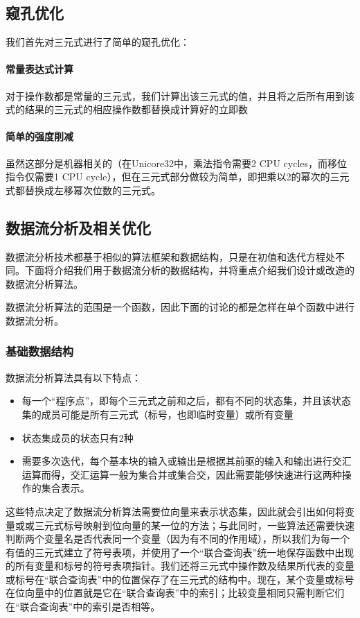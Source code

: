 \subsection{窥孔优化}
我们首先对三元式进行了简单的窥孔优化：
\paragraph*{常量表达式计算} 对于操作数都是常量的三元式，我们计算出该三元式的值，并且将之后所有用到该式的结果的三元式的相应操作数都替换成计算好的立即数
\paragraph*{简单的强度削减} 虽然这部分是机器相关的（在Unicore32中，乘法指令需要2 CPU cycles，而移位指令仅需要1 CPU cycle），但在三元式部分做较为简单，即把乘以2的幂次的三元式都替换成左移幂次位数的三元式。

\subsection{数据流分析及相关优化}
数据流分析技术都基于相似的算法框架和数据结构，只是在初值和迭代方程处不同。下面将介绍我们用于数据流分析的数据结构，并将重点介绍我们设计或改造的数据流分析算法。

数据流分析算法的范围是一个函数，因此下面的讨论的都是怎样在单个函数中进行数据流分析。

\subsubsection{基础数据结构}
\label{jointtable}
数据流分析算法具有以下特点：
\begin{itemize}
	\item 每一个“程序点”，即每个三元式之前和之后，都有不同的状态集，并且该状态集的成员可能是所有三元式（标号，也即临时变量）或所有变量
	\item 状态集成员的状态只有2种
	\item 需要多次迭代，每个基本块的输入或输出是根据其前驱的输入和输出进行交汇运算而得，交汇运算一般为集合并或集合交，因此需要能够快速进行这两种操作的集合表示。 
\end{itemize}
这些特点决定了数据流分析算法需要位向量来表示状态集，因此就会引出如何将变量或或三元式标号映射到位向量的某一位的方法；与此同时，一些算法还需要快速判断两个变量名是否代表同一个变量（因为有不同的作用域），所以我们为每一个有值的三元式建立了符号表项，并使用了一个“联合查询表”统一地保存函数中出现的所有变量和标号的符号表项指针。我们还将三元式中操作数及结果所代表的变量或标号在“联合查询表”中的位置保存了在三元式的结构中。现在，某个变量或标号在位向量中的位置就是它在“联合查询表”中的索引；比较变量相同只需判断它们在“联合查询表”中的索引是否相等。

